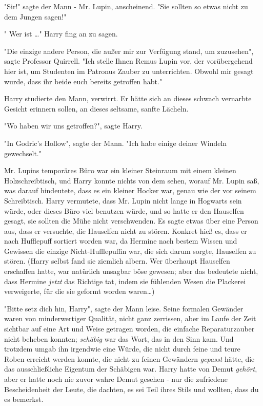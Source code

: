 {"Sir!" sagte der Mann - Mr. Lupin, anscheinend. "Sie sollten so etwas nicht zu dem Jungen sagen!"

" Wer ist …" Harry fing an zu sagen.

"Die einzige andere Person, die außer mir zur Verfügung stand, um zuzusehen", sagte Professor Quirrell. "Ich stelle Ihnen Remus Lupin vor, der vorübergehend hier ist, um Studenten im Patronus Zauber zu unterrichten. Obwohl mir gesagt wurde, dass ihr beide euch bereits getroffen habt."

Harry studierte den Mann, verwirrt. Er hätte sich an dieses schwach vernarbte Gesicht erinnern sollen, an dieses seltsame, sanfte Lächeln.

"Wo haben wir uns getroffen?", sagte Harry.

"In Godric's Hollow", sagte der Mann. "Ich habe einige deiner Windeln gewechselt."

Mr. Lupins temporäres Büro war ein kleiner Steinraum mit einem kleinen Holzschreibtisch, und Harry konnte nichts von dem sehen, worauf Mr. Lupin saß, was darauf hindeutete, dass es ein kleiner Hocker war, genau wie der vor seinem Schreibtisch. Harry vermutete, dass Mr. Lupin nicht lange in Hogwarts sein würde, oder dieses Büro viel benutzen würde, und so hatte er den Hauselfen gesagt, sie sollten die Mühe nicht verschwenden. Es sagte etwas über eine Person aus, dass er versuchte, die Hauselfen nicht zu stören. Konkret hieß es, dass er nach Hufflepuff sortiert worden war, da Hermine nach bestem Wissen und Gewissen die einzige Nicht-Hufflepuffin war, die sich darum sorgte, Hauselfen zu stören. (Harry selbst fand sie ziemlich albern. Wer überhaupt Hauselfen erschaffen hatte, war natürlich unsagbar böse gewesen; aber das bedeutete nicht, dass Hermine \emph{jetzt} das Richtige tat, indem sie fühlenden Wesen die Plackerei verweigerte, für die sie geformt worden waren…)

"Bitte setz dich hin, Harry", sagte der Mann leise. Seine formalen Gewänder waren von minderwertiger Qualität, nicht ganz zerrissen, aber im Laufe der Zeit sichtbar auf eine Art und Weise getragen worden, die einfache Reparaturzauber nicht beheben konnten; \emph{schäbig} war das Wort, das in den Sinn kam. Und trotzdem umgab ihn irgendwie eine Würde, die nicht durch feine und teure Roben erreicht werden konnte, die nicht zu feinen Gewändern \emph{gepasst} hätte, die das ausschließliche Eigentum der Schäbigen war. Harry hatte von Demut \emph{gehört}, aber er hatte noch nie zuvor wahre Demut gesehen - nur die zufriedene Bescheidenheit der Leute, die dachten, es sei Teil ihres Stils und wollten, dass du es bemerkst.

}

